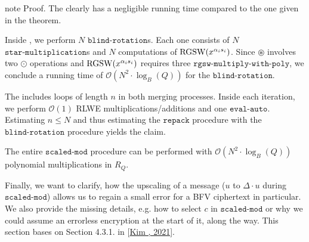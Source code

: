 \documentclass[letterpaper,10pt,english]{jupyterBook}
\begin{document}
\begin{sphinxadmonition}{note}
\sphinxAtStartPar
Proof. The {\hyperref[\detokenize{Thesis:extraction-of-lwe-ciphertexts}]{}} clearly has a negligible running time compared to the one given in the theorem.

\sphinxAtStartPar
Inside {\hyperref[\detokenize{Thesis:blind-rotation}]{}}, we perform \(N\) \(\texttt{blind-rotation}\)s.
Each one consists of \(N\) \(\texttt{star-multiplication}\)s and \(N\) computations of \(\mathrm{RGSW}(x^{\alpha_i s_i})\).
Since \(\circledast\) involves two \(\odot\) operations and \(\mathrm{RGSW}(x^{\alpha_i s_i})\) requires three \(\texttt{rgsw-multiply-with-poly}\), we conclude a running time of \(\mathcal O(N^2 \cdot \log_B(Q))\) for the \(\texttt{blind-rotation}\).

\sphinxAtStartPar
The {\hyperref[\detokenize{Thesis:repacking}]{}} includes loops of length \(n\) in both merging processes.
Inside each iteration, we perform \(\mathcal O(1)\) RLWE multiplications/additions and one \(\texttt{eval-auto}\).
Estimating \(n \le N\) and thus estimating the \(\texttt{repack}\) procedure with the \(\texttt{blind-rotation}\) procedure yields the claim.
\end{sphinxadmonition}

\sphinxAtStartPar
The entire \(\texttt{scaled-mod}\) procedure can be performed with \(\mathcal O(N^2 \cdot \log_B(Q))\) polynomial multiplications in \(R_Q\).

\begin{DUlineblock}{0em}
\item[] 
\end{DUlineblock}

\sphinxAtStartPar
Finally, we want to clarify, how the upscaling of a message (\(u\) to \(\Delta \cdot u\) during \(\texttt{scaled-mod}\)) allows us to regain a small error for a BFV ciphertext in particular.
We also provide the missing details, e.g. how to select \(c\) in \(\texttt{scaled-mod}\) or why we could assume an errorless encryption at the start of it, along the way.
This section bases on Section 4.3.1. in {[}\hyperlink{cite.Thesis:id72}{Kim , 2021}{]}.

\begin{DUlineblock}{0em}
\item[] 
\end{DUlineblock}
\end{document}
